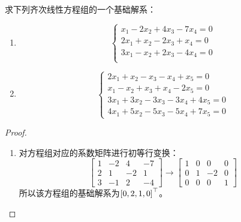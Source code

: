 \begin{problem}\label{problem-2.28}
求下列齐次线性方程组的一个基础解系：
\begin{enumerate}
    \item \begin{equation*}
              \begin{cases}
                  x_1-2x_2+4x_3-7x_4=0 \\
                  2x_1+x_2-2x_3+x_4=0  \\
                  3x_1-x_2+2x_3-4x_4=0 \\
              \end{cases}
          \end{equation*}
    \item \begin{equation*}
              \begin{cases}
                  2x_1+x_2-x_3-x_4+x_5=0     \\
                  x_1-x_2+x_3+x_4-2x_5=0     \\
                  3x_1+3x_2-3x_3-3x_4+4x_5=0 \\
                  4x_1+5x_2-5x_3-5x_4+7x_5=0
              \end{cases}
          \end{equation*}
\end{enumerate}
\end{problem}
\begin{proof}
    \begin{enumerate}
        \item 对方程组对应的系数矩阵进行初等行变换：
              \begin{equation*}
                  \begin{bmatrix}
                      1 & -2 & 4  & -7 \\
                      2 & 1  & -2 & 1  \\
                      3 & -1 & 2  & -4
                  \end{bmatrix}\longrightarrow
                  \begin{bmatrix}
                      1 & 0 & 0  & 0 \\
                      0 & 1 & -2 & 0 \\
                      0 & 0 & 0  & 1
                  \end{bmatrix}
              \end{equation*}
              所以该方程组的基础解系为\(\left[ 0,2,1,0 \right]^\top\)。
    \end{enumerate}
\end{proof}

